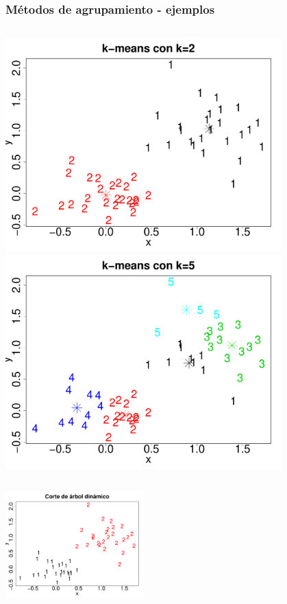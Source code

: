 \documentclass[serif,9pt, t]{beamer}
\begin{document}
\begin{frame}\frametitle{Métodos de agrupamiento - ejemplos} 
\centering
\begin{columns}[T]
    \includegraphics[width=0.8\textwidth]{ejemplo_kmeans_k2.pdf}
    \includegraphics[width=0.8\textwidth]{ejemplo_kmeans_k5.pdf}
\end{columns}
\centering
\includegraphics[width=0.4\textwidth]{ejemplo_dtc.pdf}    
\end{frame}
\end{document}
